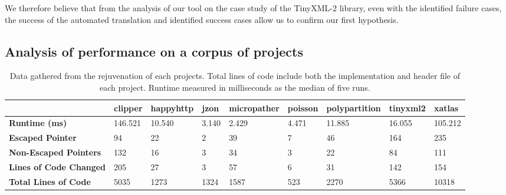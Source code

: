 \documentclass{mpaper}
\begin{document}
    We therefore believe that from the analysis of our tool on the case study of the TinyXML-2 library, even with the identified failure cases, the success of the automated translation and identified success cases allow us to confirm our first hypothesis.
    
    \subsection{Analysis of performance on a corpus of projects}
    
    \begin{table}
        \begin{tabular}{|l|l|l|l|l|l|l|l|l|}
        \hline
                                        & \textbf{clipper} & \textbf{happyhttp} & \textbf{jzon} & \textbf{micropather} & \textbf{poisson} & \textbf{polypartition} & \textbf{tinyxml2} & \textbf{xatlas} \\ \hline \hline
        \textbf{Runtime (ms)}          & 146.521          & 10.540             & 3.140                & 2.429         & 4.471            & 11.885                 & 16.055            & 105.212         \\ \hline
        \textbf{Escaped Pointer}       & 94               & 22                 & 2                    & 39            & 7                & 46                     & 164               & 235             \\ \hline
        \textbf{Non-Escaped Pointers}  & 132              & 16                 & 3                    & 34            & 3                & 22                     & 84                & 111             \\ \hline
        \textbf{Lines of Code Changed}   & 205             & 27                 & 3                    & 57            & 6                & 31                     & 142               & 154             \\ \hline
        \textbf{Total Lines of Code} & 5035             & 1273               & 1324                 & 1587          & 523              & 2270                   & 5366              & 10318           \\ \hline
        \end{tabular}    
        \caption{Data gathered from the rejuvenation of each projects. Total lines of code include both the implementation and header file of each project. Runtime measured in milliseconds as the median of five runs.}
        \label{table:data}
    \end{table}
    
\end{document}
